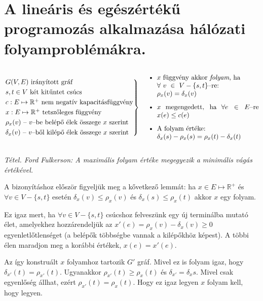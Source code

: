 ﻿\newpage
\section{A lineáris és egészértékű programozás alkalmazása hálózati folyamproblémákra.}

\[
\begin{rcases} 
G(V,E) \mbox{ irányított gráf} \\
s,t \in V \mbox{ két kitűntet csúcs} \\
c : E \mapsto \mathbb{R}^+ \mbox{ nem negatív kapacitásfüggvény}\\
x : E \mapsto \mathbb{R}^+ \mbox{ tetszőleges függvény}\\
\rho_x(v) \mbox{ -- } v\mbox{--be belépő élek összege } x \mbox{ szerint} \\
\delta_x(v) \mbox{ -- } v\mbox{--ből kilépő élek összege } x \mbox{ szerint}
\end{rcases} \parbox[c]{6.2cm}{ 
\begin{itemize}
  \item $x$ függvény akkor \emph{folyam}, ha \\ $\forall~v~\in~V - \{s,t\}$--re: \\ $\rho_x(v)=\delta_x(v)$
  \item $x$ megengedett, ha $\forall e \in E$--re $x(e) \leq c(e)$
  \item A folyam értéke: \\ $\delta_x(s)-\rho_x(s)=\rho_x(t)-\delta_x(t)$
\end{itemize}
 }
\]

\emph{Tétel. Ford Fulkerson: A maximális folyam értéke megegyezik a minimális vágás értékével.}

A bizonyításhoz először figyeljük meg a kővetkező lemmát: ha $x \in E \mapsto
\mathbb{R}^+$ és $\forall v \in V - \{s,t\}$ esetén $ \delta_x(v) \leq \rho_x(v)$
és $\delta_x(s) \leq \rho_x(t)$ akkor $x$ egy folyam. 

Ez igaz mert, ha $\forall v \in V-\{s,t\}$ csúcshoz felveszünk egy új terminálba
mutató élet, amelyekhez hozzárendeljük az $x'(e)=\rho_x(v)-\delta_x(v) \geq 0$
egyenletlőtlenséget (a belépők többségbe vannak a kilépőkhöz képest). A többi élen
maradjon meg a korábbi értékek, $x(e)=x'(e)$. 

Az így konstruált $x$ folyamhoz tartozik $G'$ gráf.  Mivel ez is folyam igaz,
hogy $\delta_{x'}(t) = \rho_{x'}(t)$. Ugyanakkor $ \rho_{x'}(t) \geq \rho_x(t)$
és $\delta_{x'}=\delta_{x}s$. Mivel csak egyenlőség állhat, ezért
$\rho_{x'}(t)=\rho_{x}(t)$. Hogy ez igaz legyen $x$ folyam kell, hogy legyen.


